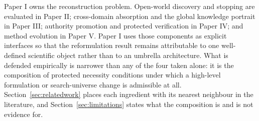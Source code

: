 Paper I owns the reconstruction problem. Open-world discovery and stopping are evaluated in Paper II; cross-domain absorption and the global knowledge portrait in Paper III; authority promotion and protected verification in Paper IV; and method evolution in Paper V. Paper I uses those components as explicit interfaces so that the reformulation result remains attributable to one well-defined scientific object rather than to an umbrella architecture.
What is defended empirically is narrower than any of the four taken alone: it is the composition of protected necessity conditions under which a high-level formulation or search-universe change is admissible at all. Section~\ref{sec:relatedwork} places each ingredient with its nearest neighbour in the literature, and Section~\ref{sec:limitations} states what the composition is and is not evidence for.
